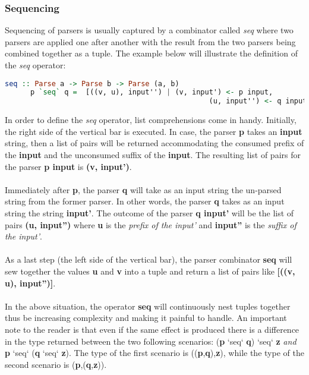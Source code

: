 \documentclass[a4paper, onecolumn]{article}
\begin{document}
    \subsubsection{Sequencing}
    
    Sequencing of parsers is usually captured by a combinator called \textit{seq} where two parsers are applied one after another with the result from the two parsers being combined together as a tuple. The example below will illustrate the definition of the \textit{seq} operator:
    
    \begin{tcolorbox}
    
    \begin{lstlisting}[language=Haskell]
      seq :: Parse a -> Parse b -> Parse (a, b)
      p `seq` q =  [((v, u), input'') | (v, input') <- p input,
                                                (u, input'') <- q input']
    \end{lstlisting}
    \end{tcolorbox}
    \noindent In order to define the \textit{seq} operator, list comprehensions come in handy. Initially, the right side of the vertical bar is executed. In case, the parser \textbf{p} takes an \textbf{input} string, then a list of pairs will be returned accommodating the consumed prefix of the \textbf{input} and the unconsumed suffix of the \textbf{input}. The resulting list of pairs for the parser \textbf{p input} is \textbf{(v, input')}. \\ \\ Immediately after \textbf{p}, the parser \textbf{q} will take as an input string the un-parsed string from the former parser. In other words, the parser \textbf{q} takes as an input string the string \textbf{input'}. The outcome of the parser \textbf{q input'} will be the list of pairs \textbf{(u, input'')} where \textbf{u} is the \textit{prefix of the input'} and \textbf{input''} is the \textit{suffix of the input'}. \\ \\
    As a last step (the left side of the vertical bar), the parser combinator \textbf{seq} will sew together the values \textbf{u} and \textbf{v} into a tuple and return a list of pairs like \textbf{[((v, u), input'')]}. \\ \\
    In the above situation, the operator \textbf{seq} will continuously nest tuples together thus be increasing complexity and making it painful to handle. An important note to the reader is that even if the same effect is produced there is a difference in the type returned between the two following scenarios: (\textbf{p} `seq` \textbf{q}) `seq` \textbf{z} \textit{and} \textbf{p} `seq` (\textbf{q} `seq` \textbf{z}). The type of the first scenario is ((\textbf{p},\textbf{q}),\textbf{z}), while the type of the second scenario is (\textbf{p},(\textbf{q},\textbf{z})).\\ \\
\end{document}
